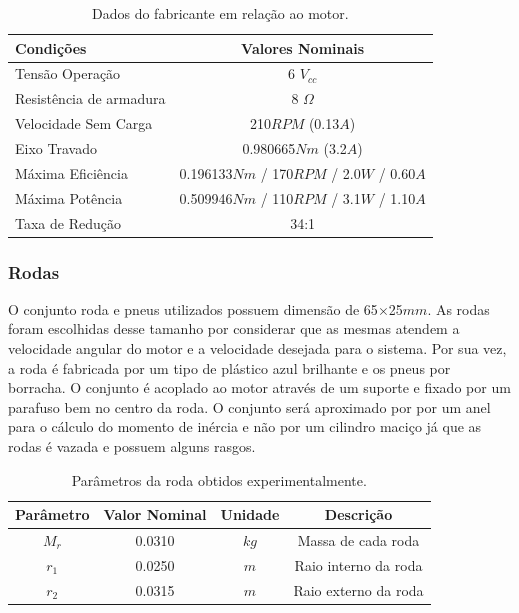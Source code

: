 \begin{table}[!htb]\label{tab:ParametrosDatasheetMotor}
\centering
\caption{Dados do fabricante em relação ao motor.}
\begin{tabular}{lc}
\hline
\textbf{Condições}       & \textbf{Valores Nominais}              \\ \hline

Tensão Operação          & 6 $V_{cc}$                           \\
Resistência de armadura  & 8 $\Omega$                           \\
Velocidade Sem Carga     & 210$RPM$ (0.13$A$)                       \\
Eixo Travado             & 0.980665$Nm$ (3.2$A$)                    \\
Máxima Eficiência        & 0.196133$Nm$ / 170$RPM$ / 2.0$W$ / 0.60$A$     \\
Máxima Potência          & 0.509946$Nm$ / 110$RPM$ / 3.1$W$ / 1.10$A$ \\
Taxa de Redução          & 34:1                                 \\
 
\hline
\end{tabular}
\end{table}

\subsubsection{Rodas}

O conjunto roda e pneus utilizados possuem dimensão de 65$\times$25$mm$. As rodas foram escolhidas desse tamanho por considerar que as mesmas atendem a velocidade angular do motor e a velocidade desejada para o sistema. Por sua vez, a roda é fabricada por um tipo de plástico azul brilhante e os pneus por borracha. O conjunto é acoplado ao motor através de um suporte e fixado por um parafuso bem no centro da roda. O conjunto será aproximado por por um anel para o cálculo do momento de inércia e não por um cilindro maciço já que as rodas é vazada e possuem alguns rasgos.
\begin{table}[!htb]\label{tab:ParametrosRoda}
\centering
\caption{Parâmetros da roda obtidos experimentalmente.}
\begin{tabular}{@{}cccc@{}}
\toprule
\textbf{Parâmetro} &\textbf{Valor Nominal} &\textbf{Unidade} &\textbf{Descrição}       \\ \midrule

\textbf{$M_r$}     & 0.0310         & $kg$            & Massa de cada roda       \\
\textbf{$r_{1}$}       & 0.0250         & $m$             & Raio interno da roda             \\
\textbf{$r_{2}$}       & 0.0315         & $m$             & Raio externo da roda             \\
\bottomrule
\end{tabular}
\end{table}

